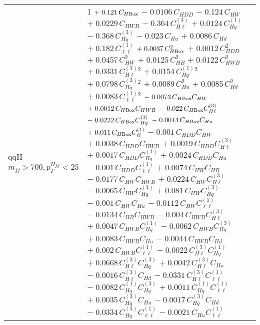 \begin{tabular}{l|p{}}
    qqH $m_{jj} > 700, p_{T}^{Hjj} < 25$ & 1 $+\;0.121\,C_{H\rm{Box}}$ $-\;0.0106\,C_{HDD}$ $-\;0.124\,C_{HW}$ $+\;0.0229\,C_{HWB}$ $-\;0.364\,C^{(3)}_{H\ell}$ $+\;0.0124\,C^{(1)}_{Hq}$ $-\;0.368\,C^{(3)}_{Hq}$ $-\;0.023\,C_{Hu}$ $+\;0.0086\,C_{Hd}$ $+\;0.182\,C^{(1)}_{\ell\ell}$ $+\;0.0037\,C_{H\rm{Box}}^{2}$ $+\;0.0012\,C_{HDD}^{2}$ $+\;0.0457\,C_{HW}^{2}$ $+\;0.0125\,C_{HB}^{2}$ $+\;0.0122\,C_{HWB}^{2}$ $+\;0.0331\,C^{(3)}_{H\ell}^{2}$ $+\;0.0154\,C^{(1)}_{Hq}^{2}$ $+\;0.0798\,C^{(3)}_{Hq}^{2}$ $+\;0.0089\,C_{Hu}^{2}$ $+\;0.0085\,C_{Hd}^{2}$ $+\;0.0083\,C^{(1)}_{\ell\ell}^{2}$ $-\;0.0073\,C_{H\rm{Box}}C_{HW}$ $+\;0.0012\,C_{H\rm{Box}}C_{HWB}$ $-\;0.022\,C_{H\rm{Box}}C^{(3)}_{H\ell}$ $-\;0.0222\,C_{H\rm{Box}}C^{(3)}_{Hq}$ $-\;0.0014\,C_{H\rm{Box}}C_{Hu}$ $+\;0.011\,C_{H\rm{Box}}C^{(1)}_{\ell\ell}$ $-\;0.001\,C_{HDD}C_{HW}$ $+\;0.0038\,C_{HDD}C_{HWB}$ $+\;0.0019\,C_{HDD}C^{(3)}_{H\ell}$ $+\;0.0017\,C_{HDD}C^{(1)}_{Hq}$ $+\;0.0024\,C_{HDD}C_{Hu}$ $-\;0.001\,C_{HDD}C^{(1)}_{\ell\ell}$ $+\;0.0074\,C_{HW}C_{HB}$ $-\;0.0177\,C_{HW}C_{HWB}$ $+\;0.0224\,C_{HW}C^{(3)}_{H\ell}$ $-\;0.0065\,C_{HW}C^{(1)}_{Hq}$ $+\;0.081\,C_{HW}C^{(3)}_{Hq}$ $-\;0.001\,C_{HW}C_{Hu}$ $-\;0.0112\,C_{HW}C^{(1)}_{\ell\ell}$ $-\;0.0134\,C_{HB}C_{HWB}$ $-\;0.004\,C_{HWB}C^{(3)}_{H\ell}$ $+\;0.0047\,C_{HWB}C^{(1)}_{Hq}$ $-\;0.0062\,C_{HWB}C^{(3)}_{Hq}$ $+\;0.0083\,C_{HWB}C_{Hu}$ $-\;0.0044\,C_{HWB}C_{Hd}$ $+\;0.002\,C_{HWB}C^{(1)}_{\ell\ell}$ $-\;0.0022\,C^{(3)}_{H\ell}C^{(1)}_{Hq}$ $+\;0.0668\,C^{(3)}_{H\ell}C^{(3)}_{Hq}$ $+\;0.0042\,C^{(3)}_{H\ell}C_{Hu}$ $-\;0.0016\,C^{(3)}_{H\ell}C_{Hd}$ $-\;0.0331\,C^{(3)}_{H\ell}C^{(1)}_{\ell\ell}$ $-\;0.0082\,C^{(1)}_{Hq}C^{(3)}_{Hq}$ $+\;0.0011\,C^{(1)}_{Hq}C^{(1)}_{\ell\ell}$ $+\;0.0035\,C^{(3)}_{Hq}C_{Hu}$ $-\;0.0017\,C^{(3)}_{Hq}C_{Hd}$ $-\;0.0334\,C^{(3)}_{Hq}C^{(1)}_{\ell\ell}$ $-\;0.0021\,C_{Hu}C^{(1)}_{\ell\ell}$ \\

\end{tabular}
